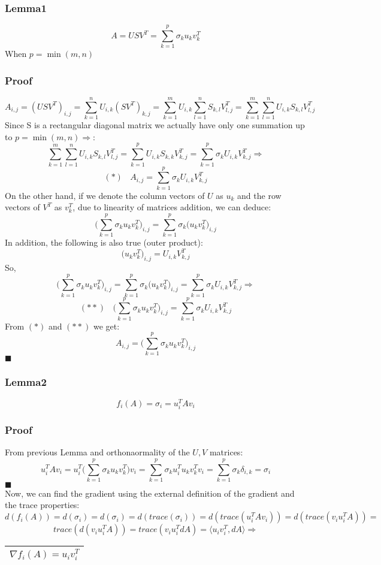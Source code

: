 \documentclass{article}
\newcommand{\rectres}[1]{
\begin{center}
\begin{tabular}{ |c| }
\hline
 #1\\
\hline
\end{tabular}
\end{center}
}
\newcommand{\qed}{\hfill$\blacksquare$}
\begin{document}
\subsubsection*{Lemma1}
$$A=USV^T=\sum_{k=1}^p\sigma_k u_{k} v^T_{k}$$ When $p=\min(m,n)$
\subsubsection*{Proof}
$$A_{i,j}=(USV^T)_{i,j}=\sum_{k=1}^n U_{i,k} (SV^T)_{k,j}=\sum_{k=1}^m U_{i,k} \sum_{l=1}^n S_{k,l}V^T_{l,j}=\sum_{k=1}^m \sum_{l=1}^n U_{i,k}  S_{k,l}V^T_{l,j}$$
Since S is a rectangular diagonal matrix we actually have only one summation up to $p=\min(m,n) \Rightarrow$:
$$\sum_{k=1}^m \sum_{l=1}^n U_{i,k}  S_{k,l}V^T_{l,j}=\sum_{k=1}^p U_{i,k}  S_{k,k}V^T_{k,j} =\sum_{k=1}^p\sigma_k U_{i,k}V^T_{k,j} \Rightarrow$$
$$(*)\:\:\:\:A_{i,j}=\sum_{k=1}^p\sigma_k U_{i,k}V^T_{k,j}$$
On the other hand, if we denote the column vectors of $U$ as $u_k$ and the row vectors of $V^T$ as $v^T_k$,
due to linearity of matrices addition, we can deduce:
$$\Big(\sum_{k=1}^p\sigma_k u_{k} v^T_{k}\Big)_{i,j}=\sum_{k=1}^p\sigma_k \Big(u_{k} v^T_{k}\Big)_{i,j}$$
In addition, the following is also true (outer product):
$$\Big(u_{k} v^T_{k}\Big)_{i,j}=U_{i,k}V^T_{k,j}$$
So,
$$\Big(\sum_{k=1}^p\sigma_k u_{k} v^T_{k}\Big)_{i,j}=\sum_{k=1}^p\sigma_k \Big(u_{k} v^T_{k}\Big)_{i,j}=\sum_{k=1}^p\sigma_k U_{i,k}V^T_{k,j}\Rightarrow$$
$$(**)\:\:\:\:\Big(\sum_{k=1}^p\sigma_k u_{k} v^T_{k}\Big)_{i,j}=\sum_{k=1}^p\sigma_k U_{i,k}V^T_{k,j}$$
From $(*)$ and $(**)$ we get:
$$A_{i,j}=\Big(\sum_{k=1}^p\sigma_k u_{k} v^T_{k}\Big)_{i,j}$$
\qed\\
\subsubsection*{Lemma2}
$$f_i(A)=\sigma_i=u_i^T A v_i$$
\subsubsection*{Proof}
From previous Lemma and orthonaormality of the $U,V$ matrices:
$$u_i^T A v_i=u_i^T \Big(\sum_{k=1}^p \sigma_k u_{k} v^T_{k}\Big)v_i=\sum_{k=1}^p \sigma_k u_i^T  u_{k} v^T_{k}v_i = \sum_{k=1}^p \sigma_k \delta_{i,k}=\sigma_i$$
\qed\\
Now, we can find the gradient using the external definition of the gradient and the trace properties:
$$d(f_i(A))=d(\sigma_i)=d(\sigma_i)=d(trace(\sigma_i))=d(trace(u_i^T A v_i))=d(trace(v_i u_i^T A )) = $$
$$trace(d(v_i u_i^T A ))=trace(v_i u_i^T dA ) = \langle u_i v_i^T, dA \rangle \Rightarrow$$
\rectres{$\nabla f_i(A)=u_i v_i^T$}
\end{document}
